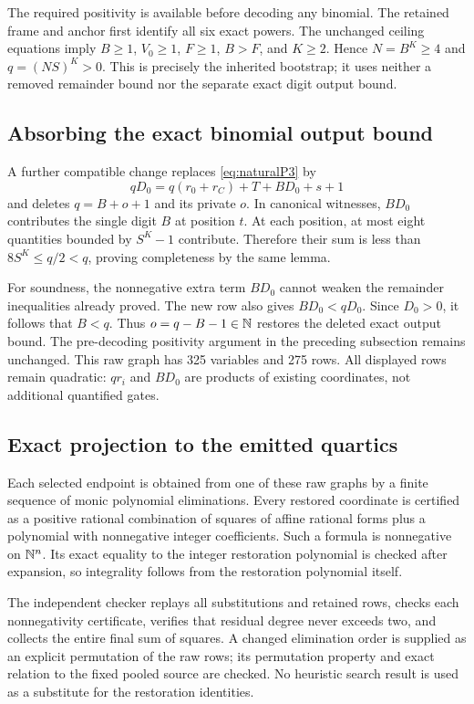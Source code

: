 The required positivity is available before decoding any binomial.
The retained frame and anchor first identify all six exact powers. The
unchanged ceiling equations imply $B\ge1$, $V_0\ge1$, $F\ge1$, $B>F$,
and $K\ge2$. Hence $N=B^K\ge4$ and $q=(NS)^K>0$.
This is precisely the inherited bootstrap; it uses neither a removed
remainder bound nor the separate exact digit output bound.

\subsection{Absorbing the exact binomial output bound}
A further compatible change replaces \eqref{eq:naturalP3} by
\begin{equation}\label{eq:naturalP3B}
 qD_0=q(r_0+r_C)+T+BD_0+s+1
\end{equation}
and deletes $q=B+o+1$ and its private $o$. In canonical witnesses,
$BD_0$ contributes the single digit $B$ at position $t$. At each position,
at most eight quantities bounded by $S^K-1$ contribute. Therefore their
sum is less than $8S^K\le q/2<q$, proving completeness by the same lemma.

For soundness, the nonnegative extra term $BD_0$ cannot weaken the
remainder inequalities already proved. The new row also gives
$BD_0<qD_0$. Since $D_0>0$, it follows that $B<q$.
Thus $o=q-B-1\in\mathbb N$ restores the deleted exact output bound.
The pre-decoding positivity argument in the preceding subsection remains
unchanged. This raw graph has 325 variables and 275 rows.
All displayed rows remain quadratic: $qr_i$ and $BD_0$ are products of
existing coordinates, not additional quantified gates.

\subsection{Exact projection to the emitted quartics}
Each selected endpoint is obtained from one of these raw graphs by a
finite sequence of monic polynomial eliminations. Every restored
coordinate is certified as a positive rational combination of squares of
affine rational forms plus a polynomial with nonnegative integer
coefficients. Such a formula is nonnegative on $\mathbb N^n$. Its exact equality
to the integer restoration polynomial is checked after expansion, so
integrality follows from the restoration polynomial itself.

The independent checker replays all substitutions and retained rows,
checks each nonnegativity certificate, verifies that residual degree never
exceeds two, and collects the entire final sum of squares. A changed
elimination order is supplied as an explicit permutation of the raw rows;
its permutation property and exact relation to the fixed pooled source
are checked. No heuristic search result is used as a substitute for the
restoration identities.

